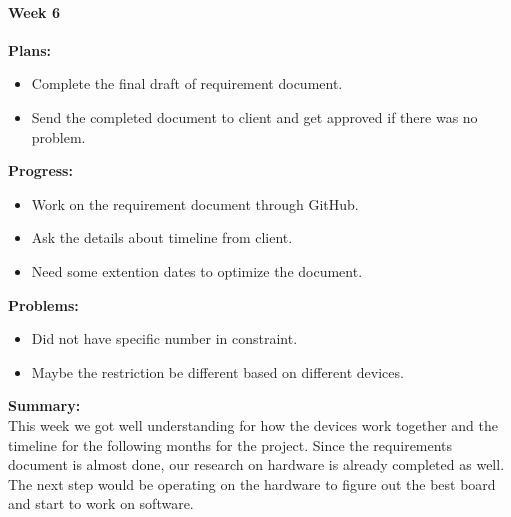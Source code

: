 \paragraph{Week 6}
\begin{adjustwidth}{2.5em}{0pt}
    \vspace{-0.5cm}\textbf{Plans:}
    \vspace{-0.5cm}
    \begin{itemize}
        \item Complete the final draft of requirement document.
        \item Send the completed document to client and get approved if there was no problem.
    \end{itemize} 
    \vspace{-0.3cm}\textbf{Progress:}
    \vspace{-0.5cm}
    \begin{itemize}
        \item Work on the requirement document through GitHub.
        \item Ask the details about timeline from client.
        \item Need some extention dates to optimize the document. 
    \end{itemize} 
    \vspace{-0.3cm}\textbf{Problems:}
    \vspace{-0.5cm}
    \begin{itemize}
        \item Did not have specific number in constraint.
        \item Maybe the restriction be different based on different devices.
    \end{itemize}  
    \vspace{-0.3cm}\noindent\textbf{Summary:}\\
    \noindent This week we got well understanding for how the devices work together and the timeline for 
    the following months for the project. Since the requirements document is almost done, our research 
    on hardware is already completed as well. The next step would be operating on the hardware to figure 
    out the best board and start to work on software. \\
\end{adjustwidth} 

